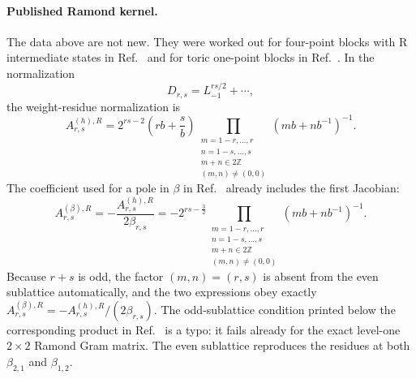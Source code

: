 \documentclass[11pt]{article}
\begin{document}
\paragraph{Published Ramond kernel.}
The data above are not new.  They were worked out for four-point blocks
with R intermediate states in Ref.~\cite{Suchanek2011EllipticRecursion}
and for toric one-point blocks in
Ref.~\cite{HadaszJaskolskiSuchanek2012Toric}.  In the normalization
\begin{equation}
 D_{r,s}=L_{-1}^{rs/2}+\cdots ,
\end{equation}
the weight-residue normalization is
\begin{equation}
 A^{(h),R}_{r,s}
 =
 2^{rs-2}\left(rb+\frac{s}{b}\right)
 \prod_{\substack{m=1-r,\ldots,r\\ n=1-s,\ldots,s\\
                   m+n\in2\mathbb Z\\(m,n)\neq(0,0)}}
 \left(mb+n b^{-1}\right)^{-1}.
 \label{eq:published-Ah-R}
\end{equation}
The coefficient used for a pole in \(\beta\) in
Ref.~\cite{Suchanek2011EllipticRecursion} already includes the first
Jacobian:
\begin{equation}
 A^{(\beta),R}_{r,s}
 =
 -\frac{A^{(h),R}_{r,s}}{2\beta_{r,s}}
 =
 -2^{rs-\frac32}
 \prod_{\substack{m=1-r,\ldots,r\\ n=1-s,\ldots,s\\
                   m+n\in2\mathbb Z\\(m,n)\neq(0,0)}}
 \left(mb+n b^{-1}\right)^{-1}.
 \label{eq:published-Abeta-R}
\end{equation}
Because \(r+s\) is odd, the factor \((m,n)=(r,s)\) is absent from the even
sublattice automatically, and the two expressions obey exactly
\(A^{(\beta),R}_{r,s}=-A^{(h),R}_{r,s}/(2\beta_{r,s})\).
The odd-sublattice condition printed below the corresponding product in
Ref.~\cite{Suchanek2011EllipticRecursion} is a typo: it fails already for
the exact level-one \(2\times2\) Ramond Gram matrix.  The even sublattice
reproduces the residues at both \(\beta_{2,1}\) and \(\beta_{1,2}\).
\end{document}
